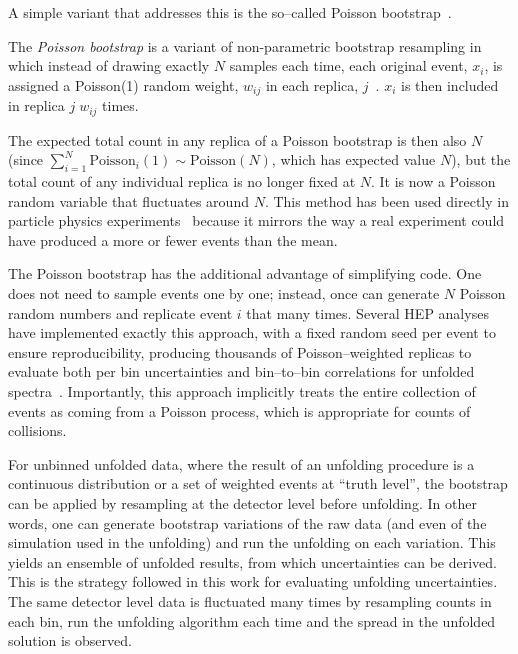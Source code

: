             A simple variant that addresses this is the so--called Poisson bootstrap~\cite{rubin_bayesian_1981, praestgaard_exchangeably_1993}.

            \begin{definition}
                The \emph{Poisson bootstrap} is a variant of non-parametric bootstrap resampling in which instead of drawing exactly $N$ samples each time, each original event, \(x_i\), is assigned a Poisson(1) random weight, \(w_{ij}\) in each replica, \(j\)~\cite{Lyons:2011cli, Bohm:2013gla}.
                \(x_i\) is then included in replica \(j\;w_{ij}\) times.
            \end{definition}

            The expected total count in any replica of a Poisson bootstrap is then also $N$ (since $\sum_{i=1}^N \text{Poisson}_i(1) \sim \text{Poisson}(N)$, which has expected value \(N\)), but the total count of any individual replica is no longer fixed at \(N\).
            It is now a Poisson random variable that fluctuates around $N$.
            This method has been used directly in particle physics experiments~\cite{ATLAS:2025ztg, Favaro:2025psi} because it mirrors the way a real experiment could have produced a more or fewer events than the mean.
            
            The Poisson bootstrap has the additional advantage of simplifying code.
            One does not need to sample events one by one;
            instead, once can generate $N$ Poisson random numbers and replicate event $i$ that many times.
            Several HEP analyses have implemented exactly this approach, with a fixed random seed per event to ensure reproducibility, producing thousands of Poisson--weighted replicas to evaluate both per bin uncertainties and bin--to--bin correlations for unfolded spectra~\cite{ATLAS:2024tqe, ATLAS:2023qzf, ATLAS:2021kho, Manole:2022bmi, STAR:2022etb, CMS:2018sxu, Kuusela2015StatisticalQuantification, Burgers:1989pm}.
            Importantly, this approach implicitly treats the entire collection of events as coming from a Poisson process, which is appropriate for counts of collisions.

            For unbinned unfolded data, where the result of an unfolding procedure is a continuous distribution or a set of weighted events at ``truth level'', the bootstrap can be applied by resampling at the detector level before unfolding.
            In other words, one can generate bootstrap variations of the raw data (and even of the simulation used in the unfolding) and run the unfolding on each variation.
            This yields an ensemble of unfolded results, from which uncertainties can be derived.
            This is the strategy followed in this work for evaluating unfolding uncertainties.
            The same detector level data is fluctuated many times by resampling counts in each bin, run the unfolding algorithm each time and the spread in the unfolded solution is observed.
            
